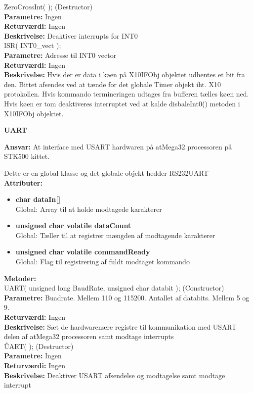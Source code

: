 \~ZeroCrossInt( ); (Destructor) \\
\textbf{Parametre:} Ingen \\
\textbf{Returværdi:} Ingen \\
\textbf{Beskrivelse:} Deaktiver interrupts for INT0 \\

ISR( INT0\_vect ); \\
\textbf{Parametre:} Adresse til INT0 vector \\
\textbf{Returværdi:} Ingen \\
\textbf{Beskrivelse:} Hvis der er data i køen på X10IFObj objektet udhentes et bit fra den. Bittet afsendes ved at tænde for det globale Timer objekt iht. X10 protokollen. Hvis kommando termineringen udtages fra bufferen tælles køen ned. Hvis køen er tom deaktiveres interruptet ved at kalde disbaleInt0() metoden i X10IFObj objektet. \\

%
%
{\centering
\textbf{UART}\par
}
\textbf{Ansvar:} At interface med USART hardwaren på atMega32 processoren på STK500 kittet.

Dette er en global klasse og det globale objekt hedder RS232UART \\
\textbf{Attributer:}
\begin{itemize}
	\item \textbf{char dataIn[]} \\
	Global: Array til at holde modtagede karakterer
	\item \textbf{unsigned char volatile dataCount} \\
	Global: Tæller til at registrer mængden af modtagende karakterer
	\item \textbf{unsigned char volatile commandReady} \\
	Global: Flag til registrering af fuldt modtaget kommando
\end{itemize}
\textbf{Metoder:} \\
UART( unsigned long BaudRate, unsigned char databit ); (Constructor) \\
\textbf{Parametre:} Buadrate. Mellem 110 og 115200. Antallet af databits. Mellem 5 og 9. \\
\textbf{Returværdi:} Ingen \\
\textbf{Beskrivelse:} Sæt de hardwarenære registre til kommunikation med USART delen af atMega32 processoren samt modtage interrupts \\

\~UART( ); (Destructor) \\
\textbf{Parametre:} Ingen \\
\textbf{Returværdi:} Ingen \\
\textbf{Beskrivelse:} Deaktiver USART afsendelse og modtagelse samt modtage interrupt \\

